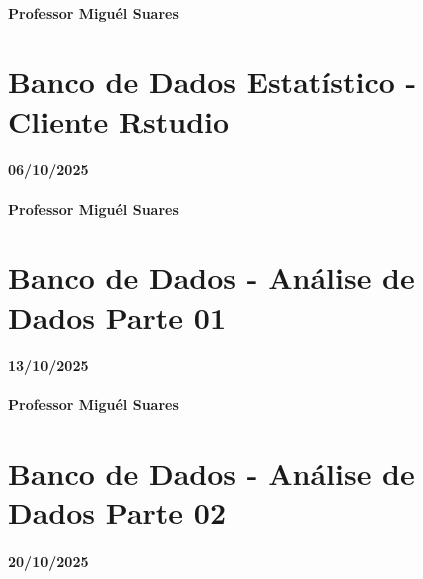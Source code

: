 \documentclass[
]{book}
\begin{document}
\subsubsection*{Professor Miguél Suares}\label{professor-miguuxe9l-suares-7}

\chapter{Banco de Dados Estatístico - Cliente Rstudio}\label{banco-de-dados-estatuxedstico---cliente-rstudio}

\subsubsection*{06/10/2025}\label{section-8}

\subsubsection*{Professor Miguél Suares}\label{professor-miguuxe9l-suares-8}

\chapter{Banco de Dados - Análise de Dados Parte 01}\label{banco-de-dados---anuxe1lise-de-dados-parte-01}

\subsubsection*{13/10/2025}\label{section-9}

\subsubsection*{Professor Miguél Suares}\label{professor-miguuxe9l-suares-9}

\chapter{Banco de Dados - Análise de Dados Parte 02}\label{banco-de-dados---anuxe1lise-de-dados-parte-02}

\subsubsection*{20/10/2025}\label{section-10}
\end{document}
